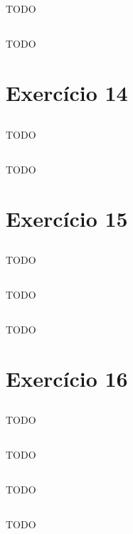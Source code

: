 \documentclass{article}
\begin{document}
\subsection{}
TODO

\subsection{}
TODO

\section{Exercício 14}
\subsection{}
TODO
\subsection{}
TODO

\section{Exercício 15}
\subsection{}
TODO
\subsection{}
TODO
\subsection{}
TODO

\section{Exercício 16}
\subsection{}
TODO
\subsection{}
TODO
\subsection{}
TODO
\subsection{}
TODO
\end{document}
